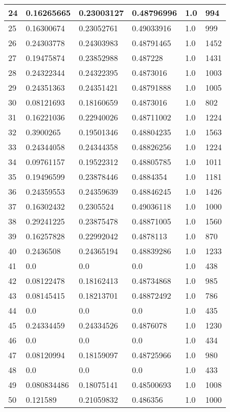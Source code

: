 \begin{longtable}{|l|l|l|l|l|l|}
24 & 0.16265665 & 0.23003127 & 0.48796996 & 1.0 & 994 \\ \hline 
25 & 0.16300674 & 0.23052761 & 0.49033916 & 1.0 & 999 \\ \hline 
26 & 0.24303778 & 0.24303983 & 0.48791465 & 1.0 & 1452 \\ \hline 
27 & 0.19475874 & 0.23852988 & 0.487228 & 1.0 & 1431 \\ \hline 
28 & 0.24322344 & 0.24322395 & 0.4873016 & 1.0 & 1003 \\ \hline 
29 & 0.24351363 & 0.24351421 & 0.48791888 & 1.0 & 1005 \\ \hline 
30 & 0.08121693 & 0.18160659 & 0.4873016 & 1.0 & 802 \\ \hline 
31 & 0.16221036 & 0.22940026 & 0.48711002 & 1.0 & 1224 \\ \hline 
32 & 0.3900265 & 0.19501346 & 0.48804235 & 1.0 & 1563 \\ \hline 
33 & 0.24344058 & 0.24344358 & 0.48826256 & 1.0 & 1224 \\ \hline 
34 & 0.09761157 & 0.19522312 & 0.48805785 & 1.0 & 1011 \\ \hline 
35 & 0.19496599 & 0.23878446 & 0.4884354 & 1.0 & 1181 \\ \hline 
36 & 0.24359553 & 0.24359639 & 0.48846245 & 1.0 & 1426 \\ \hline 
37 & 0.16302432 & 0.2305524 & 0.49036118 & 1.0 & 1000 \\ \hline 
38 & 0.29241225 & 0.23875478 & 0.48871005 & 1.0 & 1560 \\ \hline 
39 & 0.16257828 & 0.22992042 & 0.4878113 & 1.0 & 870 \\ \hline 
40 & 0.2436508 & 0.24365194 & 0.48839286 & 1.0 & 1233 \\ \hline 
41 & 0.0 & 0.0 & 0.0 & 1.0 & 438 \\ \hline 
42 & 0.08122478 & 0.18162413 & 0.48734868 & 1.0 & 985 \\ \hline 
43 & 0.08145415 & 0.18213701 & 0.48872492 & 1.0 & 786 \\ \hline 
44 & 0.0 & 0.0 & 0.0 & 1.0 & 435 \\ \hline 
45 & 0.24334459 & 0.24334526 & 0.4876078 & 1.0 & 1230 \\ \hline 
46 & 0.0 & 0.0 & 0.0 & 1.0 & 434 \\ \hline 
47 & 0.08120994 & 0.18159097 & 0.48725966 & 1.0 & 980 \\ \hline 
48 & 0.0 & 0.0 & 0.0 & 1.0 & 433 \\ \hline 
49 & 0.080834486 & 0.18075141 & 0.48500693 & 1.0 & 1008 \\ \hline 
50 & 0.121589 & 0.21059832 & 0.486356 & 1.0 & 1000 \\ \hline 
\end{longtable}